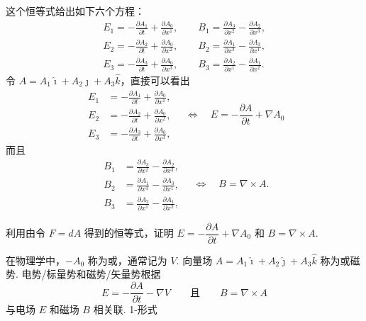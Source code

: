 这个恒等式给出如下六个方程：
\begin{align*}
E_1=-\frac{\partial A_1}{\partial t}+\frac{\partial A_0}{\partial x^1},\qquad B_1=\frac{\partial A_3}{\partial x^2}-\frac{\partial A_2}{\partial x^3}, \\
E_2=-\frac{\partial A_2}{\partial t}+\frac{\partial A_0}{\partial x^2},\qquad B_2=\frac{\partial A_1}{\partial x^3}-\frac{\partial A_3}{\partial x^1}, \\
E_3=-\frac{\partial A_3}{\partial t}+\frac{\partial A_0}{\partial x^3},\qquad B_3=\frac{\partial A_2}{\partial x^1}-\frac{\partial A_1}{\partial x^2} .
\end{align*}
令 $A=A_1\hat{\imath}+A_2\hat{\jmath}+A_3\hat{k}$，直接可以看出
\[
\begin{aligned}
E_1&=-\frac{\partial A_1}{\partial t}+\frac{\partial A_0}{\partial x^1},\\
E_2&=-\frac{\partial A_2}{\partial t}+\frac{\partial A_0}{\partial x^2},\\
E_3&=-\frac{\partial A_3}{\partial t}+\frac{\partial A_0}{\partial x^3},
\end{aligned}
\quad\Longleftrightarrow\quad
E=-\frac{\partial A}{\partial t}+\nabla A_0
\]
而且
\[
\begin{aligned}
B_1&=\frac{\partial A_3}{\partial x^2}-\frac{\partial A_2}{\partial x^3},\\
B_2&=\frac{\partial A_1}{\partial x^3}-\frac{\partial A_3}{\partial x^1},\\
B_3&=\frac{\partial A_2}{\partial x^1}-\frac{\partial A_1}{\partial x^2},
\end{aligned}
\quad\Longleftrightarrow\quad
B=\nabla\times A .
\]

\begin{question}\label{q:12-11}
利用由令 $F=dA$ 得到的恒等式，证明 $E=-\dfrac{\partial A}{\partial t}+\nabla A_0$ 和 $B=\nabla\times A$.
\end{question}

在物理学中，$-A_0$ 称为或，通常记为 $V$. 向量场 $A=A_1\hat{\imath}+A_2\hat{\jmath}+A_3\hat{k}$ 称为或磁势. 电势/标量势和磁势/矢量势根据
\[
E=-\frac{\partial A}{\partial t}-\nabla V\qquad\text{且}\qquad B=\nabla\times A
\]
与电场 $E$ 和磁场 $B$ 相关联. 1-形式

\begin{center}
\end{center}

